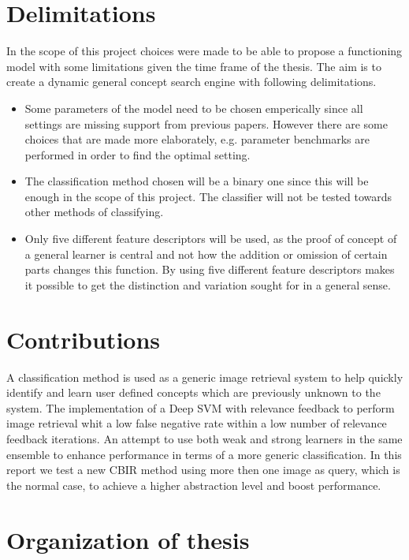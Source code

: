 \section{Delimitations}
\label{sec:intro:delimitations}
In the scope of this project choices were made to be able to propose a functioning model with some limitations given the time frame of the thesis. The aim is to create a dynamic general concept search engine with following delimitations.
\begin{itemize}
	\item Some parameters of the model need to be chosen emperically since all settings are missing support from previous papers. However there are some choices that are made more elaborately, e.g. parameter benchmarks are performed in order to find the optimal setting. 
	\item The classification method chosen will be a binary one since this will be enough in the scope of this project. The classifier will not be tested towards other methods of classifying.
	\item Only five different feature descriptors will be used, as the proof of concept of a general learner is central and not how the addition or omission of certain parts changes this function. By using five different feature descriptors makes it possible to get the distinction and variation sought for in a general sense.
\end{itemize}

\section{Contributions}

A classification method is used as a generic image retrieval system to help quickly identify and learn user defined concepts which are previously unknown to the system. 
The implementation of a Deep SVM with relevance feedback to perform image retrieval whit a low false negative rate within a low number of relevance feedback iterations. 
An attempt to use both weak and strong learners in the same ensemble to enhance performance in terms of a more generic classification. In this report we test a new CBIR method using more then one image as query, which is the normal case, to achieve a higher abstraction level and boost performance. 

\section{Organization of thesis}

